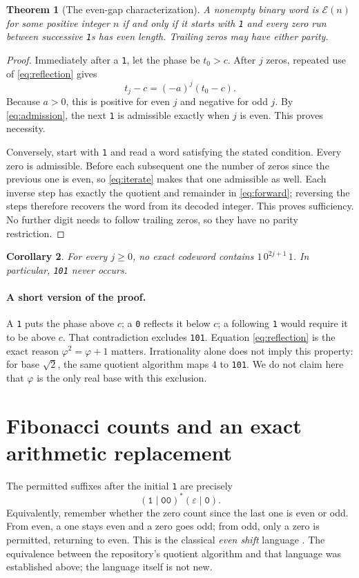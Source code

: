 \documentclass[11pt]{article}
\newtheorem{theorem}{Theorem}[section]
\newtheorem{corollary}[theorem]{Corollary}
\theoremstyle{definition}\newtheorem{definition}[theorem]{Definition}
\newcommand{\ph}{\varphi}
\newcommand{\E}{\mathcal E}
\begin{document}
\begin{theorem}[The even-gap characterization]\label{thm:even}
A nonempty binary word is $\E(n)$ for some positive integer $n$
if and only if it starts with \texttt{1} and every zero run between
successive \texttt{1}s has even length. Trailing zeros may have either parity.
\end{theorem}
\begin{proof}
Immediately after a \texttt{1}, let the phase be $t_0>c$.
After $j$ zeros, repeated use of \eqref{eq:reflection} gives
\begin{equation}\label{eq:iterate}
t_j-c=(-a)^j(t_0-c).
\end{equation}
Because $a>0$, this is positive for even $j$ and negative for odd $j$.
By \eqref{eq:admission}, the next \texttt{1} is admissible exactly
when $j$ is even. This proves necessity.

Conversely, start with \texttt{1} and read a word satisfying the stated
condition. Every zero is admissible. Before each subsequent one the
number of zeros since the previous one is even, so \eqref{eq:iterate}
makes that one admissible as well. Each inverse step has exactly the
quotient and remainder in \eqref{eq:forward}; reversing the steps
therefore recovers the word from its decoded integer. This proves
sufficiency. No further digit needs to follow trailing zeros, so they
have no parity restriction.
\end{proof}

\begin{corollary}
For every $j\ge0$, no exact codeword contains $1\,0^{2j+1}\,1$.
In particular, \texttt{101} never occurs.
\end{corollary}

\paragraph{A short version of the proof.}
A \texttt{1} puts the phase above $c$; a \texttt{0} reflects it below
$c$; a following \texttt{1} would require it to be above $c$.
That contradiction excludes \texttt{101}. Equation
\eqref{eq:reflection} is the exact reason $\ph^2=\ph+1$ matters.
Irrationality alone does not imply this property: for base $\sqrt2$,
the same quotient algorithm maps $4$ to \texttt{101}.
We do not claim here that $\ph$ is the only real base with this exclusion.

\section{Fibonacci counts and an exact arithmetic replacement}
The permitted suffixes after the initial \texttt{1} are precisely
\[
(\texttt{1}\mid\texttt{00})^*(\varepsilon\mid\texttt{0}).
\]
Equivalently, remember whether the zero count since the last one is even
or odd. From even, a one stays even and a zero goes odd; from odd, only
a zero is permitted, returning to even. This is the classical
\emph{even shift} language \cite{lind,pivato,glasscock}. The equivalence between
the repository's quotient algorithm and that language was established
above; the language itself is not new.
\end{document}
